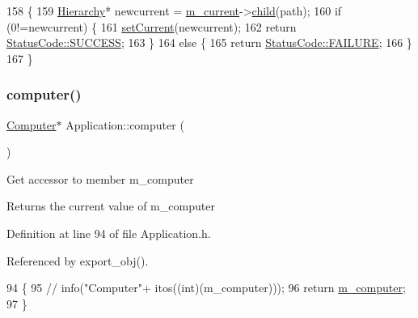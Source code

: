 \begin{DoxyCode}
158                                  \{
159     \hyperlink{classHierarchy}{Hierarchy}* newcurrent = \hyperlink{classApplication_ab0fd877a3c66c41b22109863e1719ccd}{m\_current}->\hyperlink{classHierarchy_a1e207f973c694b538bf90107b4868817}{child}(path);
160     \textcolor{keywordflow}{if} (0!=newcurrent) \{
161       \hyperlink{classApplication_a0f0a9e376d9f1716e01e86c94ae3499f}{setCurrent}(newcurrent);
162       \textcolor{keywordflow}{return} \hyperlink{classStatusCode_a6f565cbeadc76d14c72f047e5e85eb4badd0da38d3ba0d922efd1f4619bc37ad8}{StatusCode::SUCCESS};
163     \}
164     \textcolor{keywordflow}{else} \{
165       \textcolor{keywordflow}{return} \hyperlink{classStatusCode_a6f565cbeadc76d14c72f047e5e85eb4ba3da73d4c469762eb9d3c960368252b26}{StatusCode::FAILURE};
166     \}
167   \}
\end{DoxyCode}
\mbox{\label{classApplication_ac5eb8a8e693d1b93426d7aabc6606d8b}} 
\subsubsection{\texorpdfstring{computer()}{computer()}}
{\footnotesize\ttfamily \hyperlink{classComputer}{Computer}$\ast$ Application\+::computer (\begin{DoxyParamCaption}{ }\end{DoxyParamCaption})\hspace{0.3cm}{\ttfamily [inline]}}

Get accessor to member m\+\_\+computer \begin{DoxyReturn}{Returns}
the current value of m\+\_\+computer 
\end{DoxyReturn}


Definition at line 94 of file Application.\+h.



Referenced by export\+\_\+obj().


\begin{DoxyCode}
94                         \{
95     \textcolor{comment}{//    info("Computer"+ itos((int)(m\_computer)));}
96     \textcolor{keywordflow}{return} \hyperlink{classApplication_a17c9fd27b6abbc18abb6d5de5d7648ef}{m\_computer};
97   \}
\end{DoxyCode}
\mbox{\label{classApplication_ae79819f7743d6f402fce87665c1dc9a6}} 
